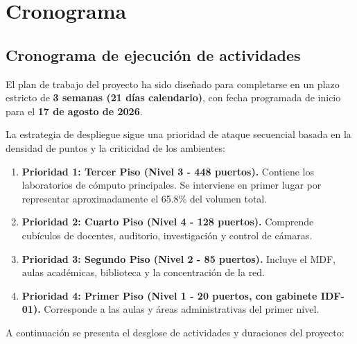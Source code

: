 \chapter{Cronograma}

\section{Cronograma de ejecución de actividades}

El plan de trabajo del proyecto ha sido diseñado para completarse en un plazo estricto de \textbf{3 semanas (21 días calendario)}, con fecha programada de inicio para el \textbf{17 de agosto de 2026}. 

La estrategia de despliegue sigue una prioridad de ataque secuencial basada en la densidad de puntos y la criticidad de los ambientes:
\begin{enumerate}
    \item \textbf{Prioridad 1: Tercer Piso (Nivel 3 - 448 puertos).} Contiene los laboratorios de cómputo principales. Se interviene en primer lugar por representar aproximadamente el 65.8\% del volumen total.
    \item \textbf{Prioridad 2: Cuarto Piso (Nivel 4 - 128 puertos).} Comprende cubículos de docentes, auditorio, investigación y control de cámaras.
    \item \textbf{Prioridad 3: Segundo Piso (Nivel 2 - 85 puertos).} Incluye el MDF, aulas académicas, biblioteca y la concentración de la red.
    \item \textbf{Prioridad 4: Primer Piso (Nivel 1 - 20 puertos, con gabinete IDF-01).} Corresponde a las aulas y áreas administrativas del primer nivel.
\end{enumerate}

A continuación se presenta el desglose de actividades y duraciones del proyecto:

